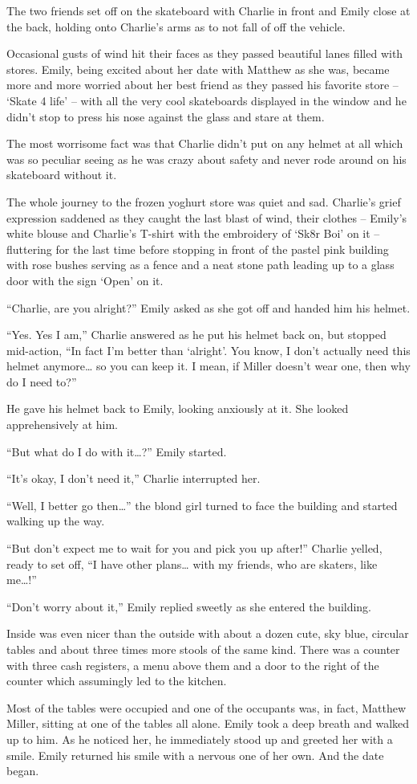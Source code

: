 The two friends set off on the skateboard with Charlie in front and Emily close at the back, holding onto Charlie’s arms as to not fall of off the vehicle.

Occasional gusts of wind hit their faces as they passed beautiful lanes filled with stores. Emily, being excited about her date with Matthew as she was, became more and more worried about her best friend as they passed his favorite store – ‘Skate 4 life’ – with all the very cool skateboards displayed in the window and he didn’t stop to press his nose against the glass and stare at them.

The most worrisome fact was that Charlie didn’t put on any helmet at all which was so peculiar seeing as he was crazy about safety and never rode around on his skateboard without it.

The whole journey to the frozen yoghurt store was quiet and sad. Charlie’s grief expression saddened as they caught the last blast of wind, their clothes – Emily’s white blouse and Charlie’s T-shirt with the embroidery of ‘Sk8r Boi’ on it – fluttering for the last time before stopping in front of the pastel pink building with rose bushes serving as a fence and a neat stone path leading up to a glass door with the sign ‘Open’ on it.

“Charlie, are you alright?” Emily asked as she got off and handed him his helmet.

“Yes. Yes I am,” Charlie answered as he put his helmet back on, but stopped mid-action, “In fact I’m better than ‘alright’. You know, I don’t actually need this helmet anymore… so you can keep it. I mean, if Miller doesn’t wear one, then why do I need to?”

He gave his helmet back to Emily, looking anxiously at it. She looked apprehensively at him.

“But what do I do with it…?” Emily started.

“It’s okay, I don’t need it,” Charlie interrupted her.

“Well, I better go then…” the blond girl turned to face the building and started walking up the way.

“But don’t expect me to wait for you and pick you up after!” Charlie yelled, ready to set off, “I have other plans… with my friends, who are skaters, like me…!”

“Don’t worry about it,” Emily replied sweetly as she entered the building.

Inside was even nicer than the outside with about a dozen cute, sky blue, circular tables and about three times more stools of the same kind. There was a counter with three cash registers, a menu above them and a door to the right of the counter which assumingly led to the kitchen.

Most of the tables were occupied and one of the occupants was, in fact, Matthew Miller, sitting at one of the tables all alone. Emily took a deep breath and walked up to him. As he noticed her, he immediately stood up and greeted her with a smile. Emily returned his smile with a nervous one of her own. And the date began.